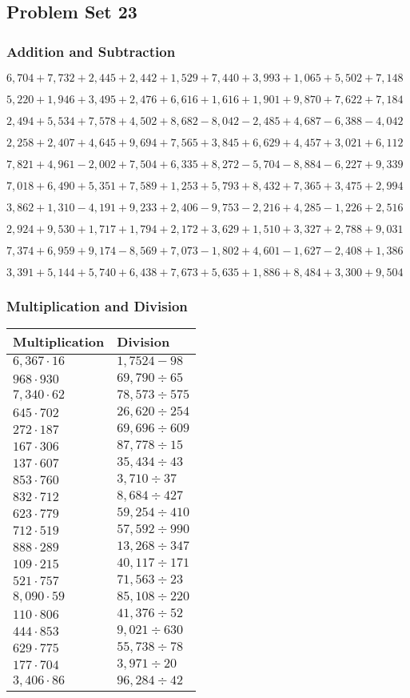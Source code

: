 \hypertarget{problem-set-23-3}{%
\subsection{Problem Set 23}\label{problem-set-23-3}}

\hypertarget{addition-and-subtraction-185}{%
\subsubsection{Addition and
Subtraction}\label{addition-and-subtraction-185}}

\(6,704+7,732+2,445+2,442+1,529+7,440+3,993+1,065+5,502+ 7,148\)

\(5,220+1,946+3,495+2,476+6,616+1,616+1,901+9,870+7,622+7,184\)

\(2,494+5,534+7,578+4,502+8,682-8,042-2,485+4,687-6,388-4,042\)

\(2,258+2,407+4,645+9,694+7,565+3,845+6,629+4,457+3,021+6,112\)

\(7,821+4,961-2,002+7,504+6,335+8,272-5,704-8,884-6,227+9,339\)

\(7,018+6,490+5,351+7,589+1,253+5,793+8,432+7,365+3,475+2,994\)

\(3,862+1,310-4,191+9,233+2,406-9,753-2,216+4,285-1,226+2,516\)

\(2,924+9,530+1,717+1,794+2,172+3,629+1,510+3,327+2,788+9,031\)

\(7,374+6,959+9,174-8,569+7,073-1,802+4,601-1,627-2,408+1,386\)

\(3,391+5,144+5,740+6,438+7,673+5,635+1,886+8,484+3,300+9,504\)

\hypertarget{multiplication-and-division-184}{%
\subsubsection{Multiplication and
Division}\label{multiplication-and-division-184}}

\begin{longtable}[]{@{}ll@{}}
\toprule
Multiplication & Division\tabularnewline
\midrule
\endhead
\(6,367\cdot16\) & \(1,752 4-98\)\tabularnewline
\(968\cdot930\) & \(69,790÷65\)\tabularnewline
\(7,340\cdot62\) & \(78,573÷575\)\tabularnewline
\(645\cdot702\) & \(26,620÷254\)\tabularnewline
\(272\cdot187\) & \(69,696÷609\)\tabularnewline
\(167\cdot306\) & \(87,778÷15\)\tabularnewline
\(137\cdot607\) & \(35,434÷43\)\tabularnewline
\(853\cdot760\) & \(3,710÷37\)\tabularnewline
\(832\cdot712\) & \(8,684÷427\)\tabularnewline
\(623\cdot779\) & \(59,254÷410\)\tabularnewline
\(712\cdot519\) & \(57,592÷990\)\tabularnewline
\(888\cdot289\) & \(13,268÷347\)\tabularnewline
\(109\cdot215\) & \(40,117÷171\)\tabularnewline
\(521\cdot757\) & \(71,563÷23\)\tabularnewline
\(8,090\cdot59\) & \(85,108÷220\)\tabularnewline
\(110\cdot806\) & \(41,376÷52\)\tabularnewline
\(444\cdot853\) & \(9,021÷630\)\tabularnewline
\(629\cdot775\) & \(55,738÷78\)\tabularnewline
\(177\cdot704\) & \(3,971÷20\)\tabularnewline
\(3,406\cdot86\) & \(96,284÷42\)\tabularnewline
\bottomrule
\end{longtable}

